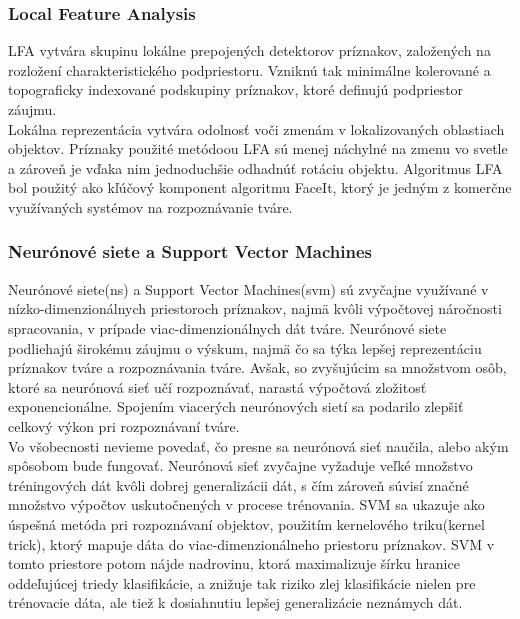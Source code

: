 \subsubsection{Local Feature Analysis}
LFA vytvára skupinu lokálne prepojených detektorov príznakov, založených na rozložení charakteristického podpriestoru.
Vzniknú tak minimálne kolerované a topograficky indexované podskupiny príznakov, ktoré definujú podpriestor záujmu. \cite{handbookbio} \\

\indent Lokálna reprezentácia vytvára odolnosť voči zmenám v lokalizovaných oblastiach objektov.
Príznaky použité metódoou LFA sú menej náchylné na zmenu vo svetle a zároveň je vďaka nim jednoduchšie odhadnúť
rotáciu objektu.
Algoritmus LFA bol použitý ako kľúčový komponent algoritmu FaceIt, ktorý je jedným z komerčne využívaných systémov na rozpoznávanie tváre\cite{handbookbio}.

\subsubsection{Neurónové siete a Support Vector Machines}\label{svm}
Neurónové siete(\acrshort{ns}) a Support Vector Machines(\acrshort{svm}) sú zvyčajne využívané v nízko-dimenzionálnych priestoroch príznakov, najmä kvôli výpočtovej náročnosti spracovania,
v prípade viac-dimenzionálnych dát tváre\cite{handbookbio}.
Neurónové siete podliehajú širokému záujmu o výskum, najmä čo sa týka lepšej reprezentáciu príznakov tváre a rozpoznávania tváre.
Avšak, so zvyšujúcim sa množstvom osôb, ktoré sa neurónová sieť učí rozpoznávať, narastá výpočtová zložitosť exponencionálne.
Spojením viacerých neurónových sietí sa podarilo zlepšiť celkový výkon pri rozpoznávaní tváre.\\

\indent Vo všobecnosti nevieme povedať, čo presne sa neurónová sieť naučila, alebo akým spôsobom bude fungovať.
Neurónová sieť zvyčajne vyžaduje veľké množstvo tréningových dát kvôli dobrej generalizácii dát, s čím zároveň súvisí značné množstvo výpočtov uskutočnených v procese trénovania.
SVM sa ukazuje ako úspešná metóda pri rozpoznávaní objektov, použitím kernelového triku(kernel trick), ktorý mapuje dáta do viac-dimenzionálneho priestoru príznakov\cite{handbookbio}.
SVM v tomto priestore potom nájde nadrovinu, ktorá maximalizuje šírku hranice oddeľujúcej triedy klasifikácie, a znižuje tak riziko zlej klasifikácie nielen pre trénovacie dáta,
ale tiež k dosiahnutiu lepšej generalizácie neznámych dát.\cite{handbookbio} \\

